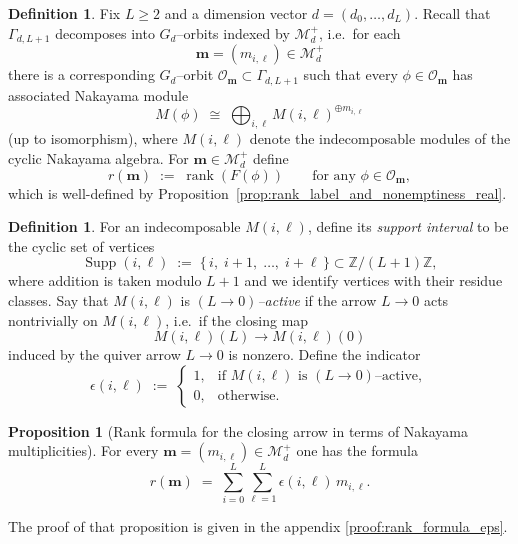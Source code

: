 \documentclass{article}
\newcommand{\rank}{\operatorname{rank}}
\newcommand{\Supp}{\operatorname{Supp}}
\theoremstyle{definition}
\newtheorem{proposition}[theorem]{Proposition}
\newtheorem{definition}[theorem]{Definition}
\begin{document}
\begin{definition}
    Fix $L\ge 2$ and a dimension vector $d=(d_0,\dots,d_L)$.
Recall that
$\Gamma_{d,L+1}$ decomposes into $G_d$--orbits indexed by $\mathcal M_d^+$, i.e.\ for each
\[
\mathbf m=(m_{i,\ell})\in \mathcal M_d^+
\]
there is a corresponding $G_d$--orbit $\mathcal O_{\mathbf m}\subset \Gamma_{d,L+1}$ such that
every $\phi\in \mathcal O_{\mathbf m}$ has associated Nakayama module
\[
M(\phi)\;\cong\;\bigoplus_{i,\ell} M(i,\ell)^{\oplus m_{i,\ell}}
\]
(up to isomorphism), where $M(i,\ell)$ denote the indecomposable modules of the cyclic Nakayama algebra.
For $\mathbf m\in\mathcal M_d^+$ define
\[
r(\mathbf m)\;:=\;\rank(F(\phi))\qquad\text{for any }\phi\in\mathcal O_{\mathbf m},
\]
which is well-defined by Proposition~\ref{prop:rank_label_and_nonemptiness_real}.
\end{definition}
\begin{definition}
    For an indecomposable $M(i,\ell)$, define its \emph{support interval} to be the cyclic set of vertices
\[
\Supp(i,\ell)\;:=\;\{\,i,\; i+1,\; \dots,\; i+\ell\,\}\subset \mathbb{Z}/(L+1)\mathbb{Z},
\]
where addition is taken modulo $L+1$ and we identify vertices with their residue classes.
Say that $M(i,\ell)$ is \emph{$(L\to 0)$--active} if the arrow $L\to 0$ acts nontrivially on $M(i,\ell)$,
i.e.\ if the closing map
\[
M(i,\ell)(L)\longrightarrow M(i,\ell)(0)
\]
induced by the quiver arrow $L\to 0$ is nonzero.
Define the indicator
\[
\epsilon(i,\ell)\;:=\;
\begin{cases}
1, & \text{if $M(i,\ell)$ is $(L\to 0)$--active},\\
0, & \text{otherwise}.
\end{cases}
\]
\end{definition}
\begin{proposition}[Rank formula for the closing arrow in terms of Nakayama multiplicities]
\label{prop:rank_formula_eps}
For every $\mathbf m=(m_{i,\ell})\in \mathcal M_d^+$ one has the formula
\begin{equation}
\label{eq:rank_formula_eps}
r(\mathbf m)\;=\;\sum_{i=0}^L\sum_{\ell=1}^L\epsilon(i,\ell)\,m_{i,\ell}.
\end{equation}
\end{proposition}
\noindent
The proof of that proposition is given in the appendix \ref{proof:rank_formula_eps}.
\end{document}
